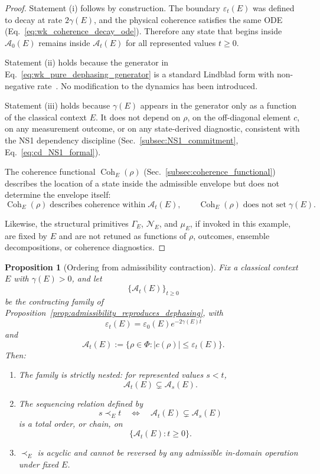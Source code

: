 \documentclass[aps,prx,onecolumn,11pt]{revtex4-2}
\theoremstyle{plain}
\newtheorem{proposition}{Proposition}
\theoremstyle{definition}
\theoremstyle{remark}
\newcommand{\Coh}{\operatorname{Coh}}       %
\begin{document}
\begin{proof}
Statement (i) follows by construction. The boundary
\(\varepsilon_t(E)\) was defined to decay at rate \(2\gamma(E)\), and
the physical coherence satisfies the same ODE
(Eq.~\ref{eq:wk_coherence_decay_ode}). Therefore any state that begins
inside \(\mathcal A_0(E)\) remains inside \(\mathcal A_t(E)\) for all
represented values \(t\geq 0\).

Statement (ii) holds because the generator in
Eq.~\eqref{eq:wk_pure_dephasing_generator} is a standard Lindblad form
with non-negative rate~\cite{Lindblad1976,Gorini1976}. No modification
to the dynamics has been introduced.

Statement (iii) holds because \(\gamma(E)\) appears in the generator
only as a function of the classical context \(E\). It does not depend on
\(\rho\), on the off-diagonal element \(c\), on any measurement outcome,
or on any state-derived diagnostic, consistent with the NS1 dependency
discipline
(Sec.~\ref{subsec:NS1_commitment}, Eq.~\ref{eq:cd_NS1_formal}).

The coherence functional \(\Coh_E(\rho)\)
(Sec.~\ref{subsec:coherence_functional}) describes the location of a
state inside the admissible envelope but does not determine the envelope
itself:
\begin{equation}
\Coh_E(\rho)
\;\text{describes coherence within}\;
\mathcal A_t(E),
\qquad
\Coh_E(\rho)
\;\text{does not set}\;
\gamma(E).
\label{eq:wk_coherence_descriptive_not_dynamical}
\end{equation}

Likewise, the structural primitives \(\Gamma_E\), \(\mathcal N_E\), and
\(\mu_E\), if invoked in this example, are fixed by \(E\) and are not
retuned as functions of \(\rho\), outcomes, ensemble decompositions, or
coherence diagnostics.
\end{proof}

\begin{proposition}[Ordering from admissibility contraction]
\label{prop:causal_ordering_from_contraction}
Fix a classical context \(E\) with \(\gamma(E)>0\), and let
\[
\{\mathcal A_t(E)\}_{t\geq 0}
\]
be the contracting family of
Proposition~\ref{prop:admissibility_reproduces_dephasing}, with
\[
\varepsilon_t(E)=\varepsilon_0(E)e^{-2\gamma(E)t}
\]
and
\[
\mathcal A_t(E)
:=
\{\rho\in\Phi: |c(\rho)|\leq\varepsilon_t(E)\}.
\]
Then:
\begin{enumerate}[label=(\roman*), leftmargin=2.2em]
\item The family is strictly nested: for represented values \(s<t\),
\[
\mathcal A_t(E)\subsetneq\mathcal A_s(E).
\]

\item The sequencing relation defined by
\[
s\prec_E t
\quad\Longleftrightarrow\quad
\mathcal A_t(E)\subsetneq\mathcal A_s(E)
\]
is a total order, or chain, on
\[
\{\mathcal A_t(E):t\geq 0\}.
\]

\item \(\prec_E\) is acyclic and cannot be reversed by any admissible
in-domain operation under fixed \(E\).
\end{enumerate}
\end{proposition}
\end{document}
